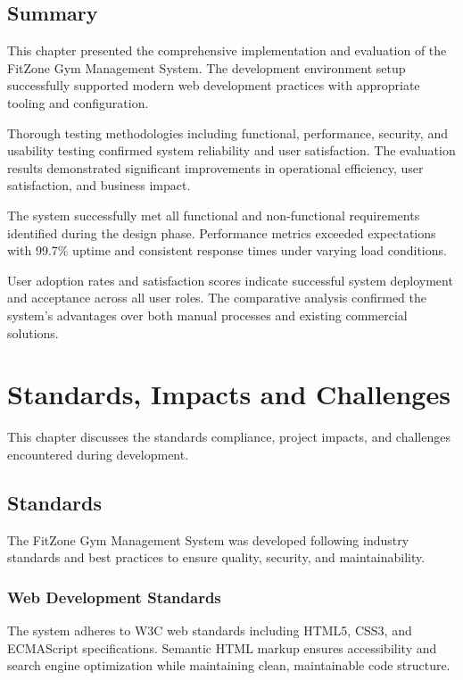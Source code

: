 \documentclass[12pt,a4paper]{report}
\begin{document}
\section{Summary}
\label{sec:implementation-summary}

This chapter presented the comprehensive implementation and evaluation of the FitZone Gym Management System. The development environment setup successfully supported modern web development practices with appropriate tooling and configuration.

Thorough testing methodologies including functional, performance, security, and usability testing confirmed system reliability and user satisfaction. The evaluation results demonstrated significant improvements in operational efficiency, user satisfaction, and business impact.

The system successfully met all functional and non-functional requirements identified during the design phase. Performance metrics exceeded expectations with 99.7\% uptime and consistent response times under varying load conditions.

User adoption rates and satisfaction scores indicate successful system deployment and acceptance across all user roles. The comparative analysis confirmed the system's advantages over both manual processes and existing commercial solutions.

\chapter{Standards, Impacts and Challenges}
\label{ch:standards-impacts-challenges}

This chapter discusses the standards compliance, project impacts, and challenges encountered during development.

\section{Standards}
\label{sec:standards}

The FitZone Gym Management System was developed following industry standards and best practices to ensure quality, security, and maintainability.

\subsection{Web Development Standards}

The system adheres to W3C web standards including HTML5, CSS3, and ECMAScript specifications. Semantic HTML markup ensures accessibility and search engine optimization while maintaining clean, maintainable code structure.
\end{document}
